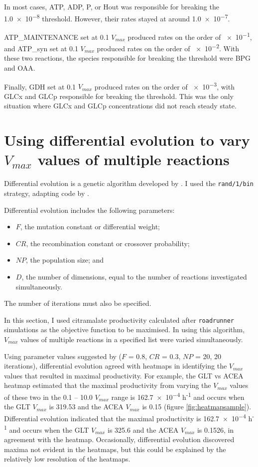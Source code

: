 \documentclass[parskip=full, numbers=noenddot]{scrreprt}
\begin{document}
In most cases, ATP, ADP, P, or Hout was responsible for breaking the \num{1.0e-8} threshold. However, their rates stayed at around \num{1.0e-7}.

ATP\_MAINTENANCE set at 0.1 $V_{max}$ produced rates on the order of \num{e-1}, and ATP\_syn set at 0.1 $V_{max}$ produced rates on the order of \num{e-2}. With these two reactions, the species responsible for breaking the threshold were BPG and OAA.

Finally, GDH set at 0.1 $V_{max}$ produced rates on the order of \num{e-3}, with GLCx and GLCp responsible for breaking the threshold. This was the only situation where GLCx and GLCp concentrations did not reach steady state.

\section{Using differential evolution to vary $V_{max}$ values of multiple reactions}
\label{sec:de}

Differential evolution is a genetic algorithm developed by \citet{storn_differential_1997}. I used the \texttt{rand/1/bin} strategy, adapting code by \citet{mier_tutorial_2017, mier_small_2017}.

Differential evolution includes the following parameters:
\begin{itemize}
\item $F$, the mutation constant or differential weight;
\item $CR$, the recombination constant or crossover probability;
\item $NP$, the population size; and
  \item $D$, the number of dimensions, equal to the number of reactions investigated simultaneously.
\end{itemize}
The number of iterations must also be specified.

In this section, I used citramalate productivity calculated after \texttt{roadrunner} simulations as the objective function to be maximised. In using this algorithm, $V_{max}$ values of multiple reactions in a specified list were varied simultaneously.

Using parameter values suggested by \citet{storn_differential_1997} ($F$ = 0.8, $CR$ = 0.3, $NP$ = 20, 20 iterations), differential evolution agreed with heatmaps in identifying the $V_{max}$ values that resulted in maximal productivity.
For example, the GLT vs ACEA heatmap estimated that the maximal productivity from varying the $V_{max}$ values of these two in the 0.1 -- 10.0 $V_{max}$ range is \num{162.7e-4} h\textsuperscript{-1} and occurs when the GLT $V_{max}$ is 319.53 and the ACEA $V_{max}$ is 0.15 (figure \ref{fig:heatmapsample}). Differential evolution indicated that the maximal productivity is \num{162.7e-4} h\textsuperscript{-1} and occurs when the GLT $V_{max}$ is 325.6 and the ACEA $V_{max}$ is 0.1526, in agreement with the heatmap.
Occasionally, differential evolution discovered maxima not evident in the heatmaps, but this could be explained by the relatively low resolution of the heatmaps. 
\end{document}
